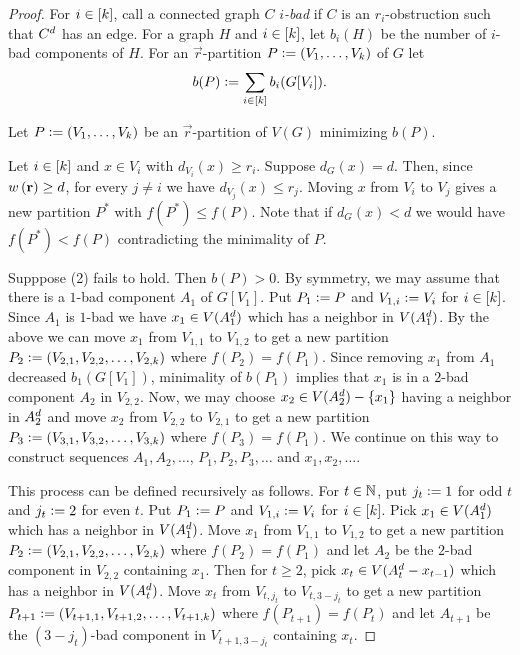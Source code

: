 \begin{proof}
         For $i \in \left[k\right]$, call a connected graph $C$
			\emph{$i$-bad} if $C$ is an $r_i$-obstruction such that $C^{d}$ has an edge. 
         For a graph $H$ and $i
			\in \left[k\right]$, let $b_i(H)$ be the number of $i$-bad components of $H$.
			For an $\vec{r}$-partition $P \mathrel{\mathop:}= \left( V_1, \ldots, V_k \right)$ of $G$ let
			\[b(P) \mathrel{\mathop:}= \sum_{i \in \left[k\right]} b_i(G[V_i]).\]
			
			\noindent Let $P \mathrel{\mathop:}= \left( V_1, \ldots, V_k \right)$ be an $\vec{r}$-partition of
			$V(G)$ minimizing $b(P)$.

			Let $i \in \left[k\right]$ and $x \in V_i$ with $d_{V_i}(x) \geq r_i$.  Suppose $d_G(x) = d$.
			Then, since $w\left( \mathbf{r} \right) \geq d$, for every $j \neq i$ we have $d_{V_j}(x) \leq
			r_j$. Moving $x$ from $V_i$ to $V_j$ gives a new partition $P^*$ with $f(P^*)
			\leq f(P)$. Note that if $d_{G}(x) < d$ we would have $f(P^*) < f(P)$
			contradicting the minimality of $P$.

			Supppose (2) fails to hold.  Then $b(P) > 0$.  By symmetry, we may assume that there is a
			$1$-bad component $A_1$ of $G[V_{1}]$. Put $P_1 \mathrel{\mathop:}= P$ and $V_{1,i}
			\mathrel{\mathop:}= V_i$ for $i \in \left[k\right]$. Since $A_1$ is $1$-bad we have $x_1
			\in V(A_1^{d})$ which has a neighbor in $V(A_1^{d})$. By the above we
			can move $x_1$ from $V_{1, 1}$ to $V_{1, 2}$ to get a new partition $P_2
			\mathrel{\mathop:}= \left( V_{2, 1}, V_{2,2}, \ldots, V_{2,k} \right)$ where $f(P_2) = f(P_1)$.  
         Since removing $x_1$ from $A_1$ decreased $b_{1}(G[V_{1}])$, minimality of
			$b(P_1)$ implies that $x_1$ is in a $2$-bad component $A_2$ in $V_{2,2}$.			
			Now, we may choose $x_2 \in
			V(A_2^{d}) - \left\{ x_1 \right\}$ having a neighbor in $A_2^{d}$ and move
			$x_2$ from $V_{2, 2}$ to $V_{2, 1}$ to get a new partition $P_3
			\mathrel{\mathop:}= \left( V_{3, 1}, V_{3,2}, \ldots, V_{3,k} \right)$ where $f(P_3) =
			f(P_1)$.  We continue on this way to construct sequences $A_1, A_2, \ldots$, $P_1, P_2, P_3, \ldots$ and $x_1, x_2, \ldots$.
						
			This process can be defined recursively as follows. For $t \in \mathbb{N}$, put $j_t \mathrel{\mathop:}= 1$ for odd $t$ and $j_t \mathrel{\mathop:}= 2$ for even $t$. Put $P_1 \mathrel{\mathop:}= P$ and $V_{1,i} \mathrel{\mathop:}= V_i$ for $i \in \left[k\right]$. Pick $x_1	\in V(A_1^{d})$ which has a neighbor in $V(A_1^{d})$. Move $x_1$ from $V_{1, 1}$ to $V_{1, 2}$ to get a new partition $P_2 \mathrel{\mathop:}= \left( V_{2, 1}, V_{2,2}, \ldots, V_{2,k} \right)$ where $f(P_2) = f(P_1)$ and let $A_2$ be the $2$-bad component in $V_{2,2}$ containing $x_1$. Then for $t \geq 2$, pick $x_t \in V(A_t^{d} - x_{t-1})$ which has a neighbor in $V(A_t^{d})$. Move $x_t$ from $V_{t, j_t}$ to $V_{t, 3-j_t}$ to get a new partition $P_{t+1} \mathrel{\mathop:}= \left( V_{t+1, 1}, V_{t+1,2}, \ldots, V_{t+1,k} \right)$ where $f(P_{t+1}) = f(P_t)$ and let $A_{t+1}$ be the $(3-j_t)$-bad component in $V_{t+1,3-j_t}$ containing $x_t$.


\end{proof}
